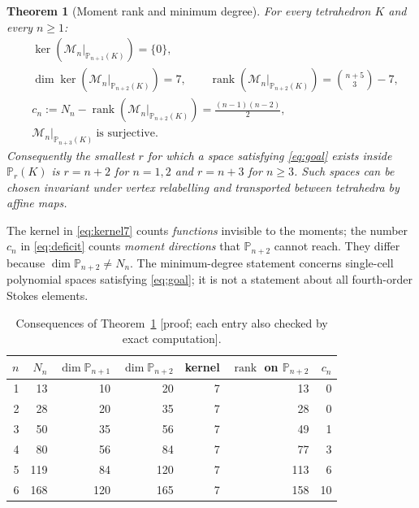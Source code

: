 \documentclass[11pt,a4paper]{article}
\newtheorem{theorem}{Theorem}[section]
\theoremstyle{definition}
\theoremstyle{remark}
\newcommand{\M}{\mathcal M}
\newcommand{\evid}[1]{\textsf{[#1]}}
\newcommand{\Pol}{\mathbb P}
\begin{document}
\begin{theorem}[Moment rank and minimum degree]
\label{thm:main}
For every tetrahedron \(K\) and every \(n\ge1\):
\begin{align}
 &\ker(\M_n|_{\Pol_{n+1}(K)})=\{0\},\label{eq:inj}\\
 &\dim\ker(\M_n|_{\Pol_{n+2}(K)})=7,\qquad
 \operatorname{rank}(\M_n|_{\Pol_{n+2}(K)})=\binom{n+5}3-7,\label{eq:kernel7}\\
 &c_n:=N_n-\operatorname{rank}(\M_n|_{\Pol_{n+2}(K)})=\frac{(n-1)(n-2)}2,
 \label{eq:deficit}\\
 &\M_n|_{\Pol_{n+3}(K)}\ \text{is surjective.}\label{eq:surj}
\end{align}
Consequently the smallest \(r\) for which a space satisfying
\eqref{eq:goal} exists inside \(\Pol_r(K)\) is \(r=n+2\) for \(n=1,2\) and
\(r=n+3\) for \(n\ge3\). Such spaces can be chosen invariant under vertex
relabelling and transported between tetrahedra by affine maps.
\end{theorem}

The kernel in \eqref{eq:kernel7} counts \emph{functions} invisible to
the moments; the number \(c_n\) in \eqref{eq:deficit} counts
\emph{moment directions} that \(\Pol_{n+2}\) cannot reach. They differ
because \(\dim\Pol_{n+2}\ne N_n\). The minimum-degree statement concerns
single-cell polynomial spaces satisfying \eqref{eq:goal}; it is not a
statement about all fourth-order Stokes elements.

\begin{table}[ht]
\centering
\caption{Consequences of Theorem~\ref{thm:main} \evid{proof; each entry
also checked by exact computation}.}
\label{tab:ranks}
\begin{tabular}{rrrrrrr}
\toprule
\(n\)&\(N_n\)&\(\dim\Pol_{n+1}\)&\(\dim\Pol_{n+2}\)&kernel&
\(\operatorname{rank}\) on \(\Pol_{n+2}\)&\(c_n\)\\
\midrule
1&13&10&20&7&13&0\\
2&28&20&35&7&28&0\\
3&50&35&56&7&49&1\\
4&80&56&84&7&77&3\\
5&119&84&120&7&113&6\\
6&168&120&165&7&158&10\\
\bottomrule
\end{tabular}
\end{table}
\end{document}
